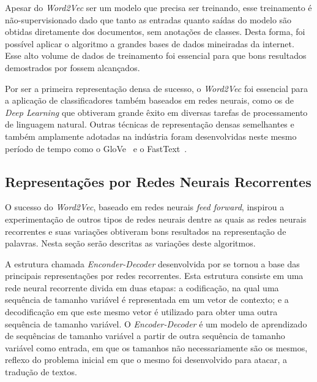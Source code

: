 Apesar do \textit{Word2Vec} ser um modelo que precisa ser treinando, esse
treinamento é não-supervisionado dado que tanto as entradas quanto saídas do
modelo são obtidas diretamente dos documentos, sem anotações de classes.
Desta forma, foi possível aplicar o algoritmo a grandes bases de dados
mineiradas da internet.
Esse alto volume de dados de treinamento foi essencial para que bons resultados
demostrados por \citet{mikolov13} fossem alcançados.

Por ser a primeira representação densa de sucesso, o \textit{Word2Vec} foi
essencial para a aplicação de classificadores também baseados em redes neurais,
como os de \textit{Deep Learning} que obtiveram grande êxito em diversas
tarefas de processamento de linguagem natural.
Outras técnicas de representação densas semelhantes e também amplamente adotadas
na indústria foram desenvolvidas neste mesmo período de tempo como o
GloVe~\cite{pennington14} e o FastText~\cite{bojanowski17}.


\subsection{Representações por Redes Neurais Recorrentes}
\label{representation:rnn}

O sucesso do \textit{Word2Vec}, baseado em redes neurais \textit{feed forward},
inspirou a experimentação de outros tipos de redes neurais dentre as quais as
redes neurais recorrentes e suas variações obtiveram bons resultados na
representação de palavras.
Nesta seção serão descritas as variações deste algoritmos.

A estrutura chamada \textit{Enconder-Decoder} desenvolvida por \citet{cho14} se
tornou a base das principais representações por redes recorrentes.
Esta estrutura consiste em uma rede neural recorrente divida em duas etapas: a
codificação, na qual uma sequência de tamanho variável é representada em um
vetor de contexto; e a decodificação em que este mesmo vetor é utilizado para
obter uma outra sequência de tamanho variável.
O \textit{Encoder-Decoder} é um modelo de aprendizado de sequências de tamanho
variável a partir de outra sequência de tamanho variável como entrada, em que
os tamanhos não necessariamente são os mesmos, reflexo do problema inicial em
que o mesmo foi desenvolvido para atacar, a tradução de textos.

